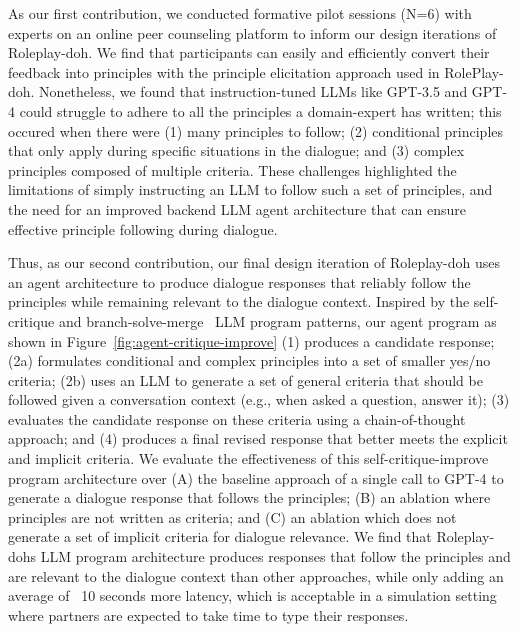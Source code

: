 As our first contribution, we conducted formative pilot sessions (N=6) with experts on an online peer counseling platform to inform our design iterations of Roleplay-doh. 
We find that participants can easily and efficiently convert their feedback into principles with the principle elicitation approach used in RolePlay-doh. Nonetheless, we found that instruction-tuned LLMs like GPT-3.5 and GPT-4 could struggle to adhere to all the principles a domain-expert has written; this occured when there were (1) many principles to follow; (2) conditional principles that only apply during specific situations in the dialogue; and (3) complex principles composed of multiple criteria.  These challenges highlighted the limitations of simply instructing an LLM to follow such a set of principles, and the need for an improved backend LLM agent architecture that can ensure effective principle following during dialogue.

Thus, as our second contribution, our final design iteration of Roleplay-doh uses an agent architecture to produce dialogue responses that reliably follow the principles while remaining relevant to the dialogue context.  Inspired by the self-critique and branch-solve-merge~\cite{saha2023branchsolvemerge} LLM program patterns, our agent program as shown in Figure~\ref{fig:agent-critique-improve} (1) produces a candidate response; (2a) formulates conditional and complex principles into a set of smaller yes/no criteria; (2b) uses an LLM to generate a set of general criteria that should be followed given a conversation context (e.g., when asked a question, answer it); (3) evaluates the candidate response on these criteria using a chain-of-thought approach; and (4) produces a final revised response that better meets the explicit and implicit criteria. We evaluate the effectiveness of this self-critique-improve program architecture over (A) the baseline approach of a single call to GPT-4 to generate a dialogue response that follows the principles; (B) an ablation where principles are not written as criteria; and (C) an ablation which does not generate a set of implicit criteria for dialogue relevance.  We find that Roleplay-dohs LLM program architecture  produces responses that follow the principles and are relevant to the dialogue context than other approaches, while only adding an average of ~10 seconds more latency, which is acceptable in a simulation setting where partners are expected to take time to type their responses.

